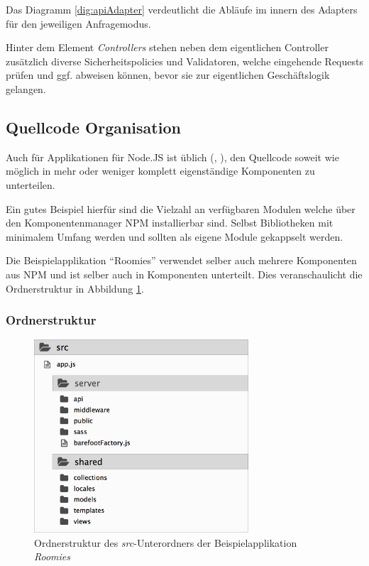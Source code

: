 Das Diagramm \ref{dig:apiAdapter} verdeutlicht die Abläufe im innern des Adapters für den jeweiligen Anfragemodus.

Hinter dem Element \emph{Controllers} stehen neben dem eigentlichen Controller zusätzlich diverse Sicherheitspolicies und Validatoren, welche eingehende Requests prüfen und ggf. abweisen können, bevor sie zur eigentlichen Geschäftslogik gelangen.




\subsection{Quellcode Organisation}
Auch für Applikationen für Node.JS ist üblich (\cite{TJH_ComponentStructure}, \cite{IZS_ComponentStructure}), den Quellcode soweit wie möglich in mehr oder weniger komplett eigenständige Komponenten zu unterteilen.

Ein gutes Beispiel hierfür sind die Vielzahl an verfügbaren Modulen welche über den Komponentenmanager NPM \cite{NPM} installierbar sind. Selbst Bibliotheken mit minimalem Umfang werden und sollten als eigene Module gekappselt werden.

Die Beispielapplikation ``Roomies'' verwendet selber auch mehrere Komponenten aus NPM \cite{NPM} und ist selber auch in
Komponenten unterteilt. Dies veranschaulicht die Ordnerstruktur in Abbildung \ref{fig:roomiesFolderStructure}.

\newpage
\subsubsection*{Ordnerstruktur}

\begin{figure}[H]
	\centering
	\includegraphics[width=8cm]{content/sad/images/folder-structure.png}
	\caption{Ordnerstruktur des \emph{src}-Unterordners der Beispielapplikation \emph{Roomies}}
	\label{fig:roomiesFolderStructure}
\end{figure}

